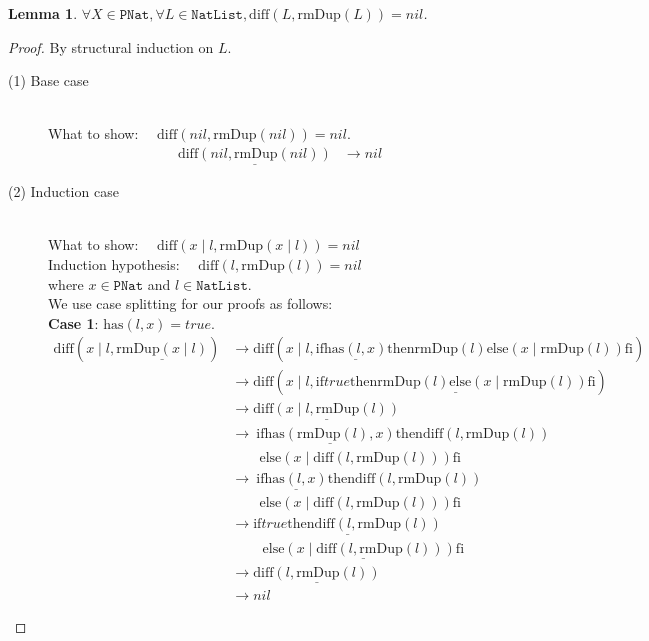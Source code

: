 \documentclass[12pt, a4paper]{article}
\newtheorem{lemma}[theorem]{Lemma}
\newcommand{\rel}[1]{\mathrel{#1}}
\newcommand{\rmx}[1]{\mathrm{#1}}
\newcommand{\larrow}{\longrightarrow}
\newcommand{\under}{\underline}
\begin{document}
\begin{lemma}
\label{lm1}
$\forall X \in \mathtt{PNat}, \forall L \in \mathtt{NatList}, \rmx{diff}(L, \rmx{rmDup}(L)) = nil$.
\end{lemma}
\begin{proof}
By structural induction on $L$.
\begin{description}
\item[(1) Base case]~\\
\noindent
What to show: $\quad \rmx{diff}(nil, \rmx{rmDup}(nil)) = nil$.
\begin{align*}
\under{\rmx{diff}(nil, \rmx{rmDup}(nil))}
	&\larrow nil \tag{by diff1}
\end{align*}
\item[(2) Induction case]~\\
What to show: $\quad \rmx{diff}(x \mid l, \rmx{rmDup}(x \mid l)) = nil$\\
Induction hypothesis: $\quad \rmx{diff}(l, \rmx{rmDup}(l)) = nil$  \\
where $x \in \mathtt{PNat}$ and $l \in \mathtt{NatList}$.\\
We use case splitting for our proofs as follows: \\
\textbf{Case 1}: $\rmx{has}(l, x) = true$.
\begin{align*}
\rmx{diff}(x \mid l, \under{\rmx{rmDup}(x \mid l)})
	&\larrow \rmx{diff}(x \mid l, \rel{\rmx{if}} \under{\rmx{has}(l, x)} \rel{\rmx{then}} \rmx{rmDup}(l) \rel{\rmx{else}} (x \mid \rmx{rmDup}(l)) \rel{\rmx{fi}}) \tag{by rmDup2} \\
	&\larrow \rmx{diff}(x \mid l, \under{\rel{\rmx{if}} true \rel{\rmx{then}} \rmx{rmDup}(l) \rel{\rmx{else}} (x \mid \rmx{rmDup}(l)) \rel{\rmx{fi}}}) \tag{by case splitting} \\	
	&\larrow \under{\rmx{diff}(x \mid l, \rmx{rmDup}(l))} \tag{by if1} \\	
	&\larrow\ \rel{\rmx{if}} \under{\rmx{has}(\rmx{rmDup}(l), x)} \rel{\rmx{then}} \rmx{diff}(l, \rmx{rmDup}(l)) \\
	&\quad \quad \rel{\rmx{else}} ( x \mid \rmx{diff}(l, \rmx{rmDup}(l))) \rel{\rmx{fi}} \tag{by diff2} \\
	&\larrow\ \rel{\rmx{if}} \under{\rmx{has}(l, x)} \rel{\rmx{then}} \rmx{diff}(l, \rmx{rmDup}(l)) \\
	&\quad \quad \rel{\rmx{else}} ( x \mid \rmx{diff}(l, \rmx{rmDup}(l))) \rel{\rmx{fi}} \tag{by Problem 17 - Lemma 1} \\
	&\larrow \under{\rel{\rmx{if}} true \rel{\rmx{then}} \rmx{diff}(l, \rmx{rmDup}(l))} \\
	&\quad \quad\ \under{\rel{\rmx{else}} ( x \mid \rmx{diff}(l, \rmx{rmDup}(l))) \rel{\rmx{fi}}} \tag{by case splitting} \\
	&\larrow \under{\rmx{diff}(l, \rmx{rmDup}(l))} \tag{by if1} \\
	&\larrow nil \tag{by IH}
\end{align*}


\end{description}
\end{proof}
\end{document}
